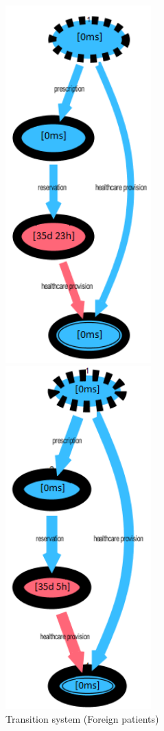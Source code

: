 \begin{figure} [htbp]
\begin{minipage}[t]{0.5\textwidth}
\includegraphics[width=0.5\textwidth, keepaspectratio]{AmbulatorioSojournForeigns}
\caption{Transition system (Foreign patients)}
\end{minipage}
\begin{minipage}[t]{0.5\textwidth}
\includegraphics[width=0.5\textwidth, keepaspectratio]{AmbulatorioSojournItalians}

\end{minipage}
\end{figure}
